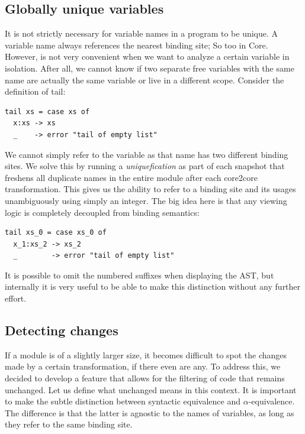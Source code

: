 \subsection{Globally unique variables}

It is not strictly necessary for variable names in a program to be unique. A variable name always
references the nearest binding site; So too in Core. However, is not very convenient
when we want to analyze a certain variable in isolation. After all, we cannot know if two separate free variables
with the same name are actually the same variable or live in a different scope. Consider the definition of tail:

\begin{listing}[H]
\begin{verbatim}
tail xs = case xs of
  x:xs -> xs
  _    -> error "tail of empty list"
\end{verbatim}
\end{listing}

We cannot simply refer to the variable  as that name has two different binding sites.
We solve this by running a \textit{uniquefication} as part of each snapshot that freshens all duplicate names in the entire
module after each core2core transformation. This gives us the ability to refer to a binding site and its usages unambiguously using simply an integer.
The big idea here is that any viewing logic is completely decoupled from binding semantics:

\begin{listing}[H]
\begin{verbatim}
tail xs_0 = case xs_0 of
  x_1:xs_2 -> xs_2
  _        -> error "tail of empty list"
\end{verbatim}
\end{listing}

It is possible to omit the numbered suffixes when displaying the AST, but internally it is very useful to be able to make
this distinction without any further effort.

\subsection{Detecting changes}

If a module is of a slightly larger size, it becomes difficult to spot the changes made by a certain
transformation, if there even are any. To address this, we decided to develop a feature that allows for
the filtering of code that remains unchanged. Let us define what unchanged means in this context. It is
important to make the subtle distinction between syntactic equivalence and $\alpha$-equivalence. The difference
is that the latter is agnostic to the names of variables, as long as they refer to the same binding site.

